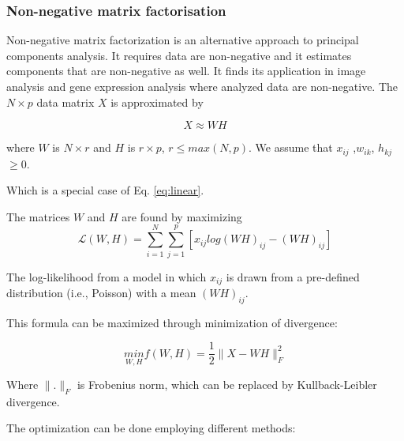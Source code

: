\documentclass[12pt,]{book}
\theoremstyle{definition}
\theoremstyle{definition}
\theoremstyle{definition}
\theoremstyle{remark}
\begin{document}
\hypertarget{non-negative-matrix-factorisation}{%
\subsubsection{Non-negative matrix
factorisation}\label{non-negative-matrix-factorisation}}

Non-negative matrix factorization \citep{Seung1999} is an alternative
approach to principal components analysis. It requires data are
non-negative and it estimates components that are non-negative as well.
It finds its application in image analysis and gene expression analysis
where analyzed data are non-negative. The \(N \times p\) data matrix
\(X\) is approximated by

\[X \approx WH \]

where \(W\) is \(N \times r\) and \(H\) is \(r \times p\),
\(r ≤ max(N,p)\). We assume that \(x_{ij}\) ,\(w_{ik}\),
\(h_{kj}\)\(\geq 0\).

Which is a special case of Eq. \eqref{eq:linear}.

The matrices \(W\) and \(H\) are found by maximizing \begin{equation}
\mathcal{L}(W, H) = \sum^N_{i=1}\sum^{p}_{j=1}[x_{ij} log(WH)_{ij} − (WH)_{ij} ] \label{eq:nmf}
\end{equation}

The log-likelihood from a model in which \(x_{ij}\) is drawn from a
pre-defined distribution (i.e., Poisson) with a mean \((WH)_{ij}\).

This formula can be maximized through minimization of divergence:

\begin{equation}
\underset{W,H}{min} f(W,H)  = \frac{1}{2}\rVert X-WH\rVert^2_F \label{eq:divNMF}
\end{equation}

Where \(\rVert .\rVert_F\) is Frobenius norm, which can be replaced by
Kullback-Leibler divergence.

The optimization can be done employing different methods:
\end{document}
